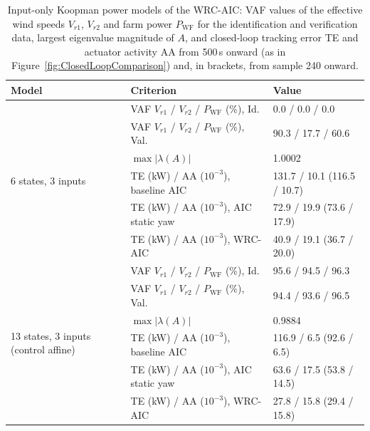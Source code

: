 \begin{table}[htbp]
    \centering
    \caption[Input-only Koopman power models of the WRC-AIC]{Input-only Koopman power models of the WRC-AIC: VAF values of the effective wind speeds $V_{r1}$, $V_{r2}$ and farm power $P_{\text{WF}}$ for the identification and verification data, largest eigenvalue magnitude of $A$, and closed-loop tracking error TE and actuator activity AA from 500\,s onward (as in Figure~\ref{fig:ClosedLoopComparison}) and, in brackets, from sample 240 onward.}
    \label{tab:WRCModelComparison}
    \begin{tabular}{p{3.2cm} l l}
        \toprule
        Model & Criterion & Value \\
        \midrule
        \multirow{6}{=}{6 states, 3 inputs}
        & VAF $V_{r1}$ / $V_{r2}$ / $P_{\text{WF}}$ (\%), Id.  & 0.0 / 0.0 / 0.0 \\
        & VAF $V_{r1}$ / $V_{r2}$ / $P_{\text{WF}}$ (\%), Val. & 90.3 / 17.7 / 60.6 \\
        & $\max|\lambda(A)|$                                   & 1.0002 \\
        & TE (kW) / AA ($10^{-3}$), baseline AIC              & 131.7 / 10.1 \; (116.5 / 10.7) \\
        & TE (kW) / AA ($10^{-3}$), AIC static yaw            & 72.9 / 19.9 \; (73.6 / 17.9) \\
        & TE (kW) / AA ($10^{-3}$), WRC-AIC                   & 40.9 / 19.1 \; (36.7 / 20.0) \\
        \midrule
        \multirow{6}{=}{13 states, 3 inputs (control affine)}
        & VAF $V_{r1}$ / $V_{r2}$ / $P_{\text{WF}}$ (\%), Id.  & 95.6 / 94.5 / 96.3 \\
        & VAF $V_{r1}$ / $V_{r2}$ / $P_{\text{WF}}$ (\%), Val. & 94.4 / 93.6 / 96.5 \\
        & $\max|\lambda(A)|$                                   & 0.9884 \\
        & TE (kW) / AA ($10^{-3}$), baseline AIC              & 116.9 / 6.5 \; (92.6 / 6.5) \\
        & TE (kW) / AA ($10^{-3}$), AIC static yaw            & 63.6 / 17.5 \; (53.8 / 14.5) \\
        & TE (kW) / AA ($10^{-3}$), WRC-AIC                   & 27.8 / 15.8 \; (29.4 / 15.8) \\
        \bottomrule
    \end{tabular}
\end{table}


